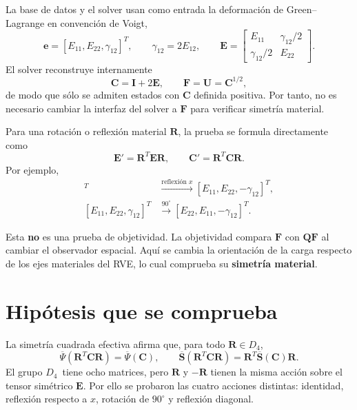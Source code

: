 \documentclass[11pt,a4paper]{article}
\newcommand{\Dfour}{\ensuremath{D_4}}
\newcommand{\Sbar}{\ensuremath{\overline{\mathbf S}}}
\newcommand{\Psibar}{\ensuremath{\overline{\Psi}}}
\begin{document}
La base de datos y el solver usan como entrada la deformación de
Green--Lagrange en convención de Voigt,
\begin{equation}
 \mathbf e = [E_{11},E_{22},\gamma_{12}]^T,
 \qquad \gamma_{12}=2E_{12},
 \qquad
 \mathbf E=
 \begin{bmatrix}
 E_{11} & \gamma_{12}/2\\
 \gamma_{12}/2 & E_{22}
 \end{bmatrix}.
\end{equation}
El solver reconstruye internamente
\begin{equation}
 \mathbf C = \mathbf I+2\mathbf E,
 \qquad
 \mathbf F=\mathbf U=\mathbf C^{1/2},
\end{equation}
de modo que sólo se admiten estados con $\mathbf C$ definida positiva. Por
tanto, no es necesario cambiar la interfaz del solver a $\mathbf F$ para
verificar simetría material.

Para una rotación o reflexión material $\mathbf R$, la prueba se formula
directamente como
\begin{equation}
 \mathbf E' = \mathbf R^T\mathbf E\mathbf R,
 \qquad
 \mathbf C'=\mathbf R^T\mathbf C\mathbf R.
 \label{eq:input-transform}
\end{equation}
Por ejemplo,
\begin{align}
 [E_{11},E_{22},\gamma_{12}]^T
 &\xrightarrow{\text{reflexión }x}
 [E_{11},E_{22},-\gamma_{12}]^T,\\
 [E_{11},E_{22},\gamma_{12}]^T
 &\xrightarrow{90^\circ}
 [E_{22},E_{11},-\gamma_{12}]^T.
\end{align}

Esta \textbf{no} es una prueba de objetividad. La objetividad compara
$\mathbf F$ con $\mathbf Q\mathbf F$ al cambiar el observador espacial. Aquí
se cambia la orientación de la carga respecto de los ejes materiales del RVE,
lo cual comprueba su \textbf{simetría material}.

\section{Hipótesis que se comprueba}

La simetría cuadrada efectiva afirma que, para todo $\mathbf R\in\Dfour$,
\begin{equation}
 \Psibar(\mathbf R^T\mathbf C\mathbf R)=\Psibar(\mathbf C),
 \qquad
 \Sbar(\mathbf R^T\mathbf C\mathbf R)
 =\mathbf R^T\Sbar(\mathbf C)\mathbf R.
 \label{eq:d4}
\end{equation}
El grupo \Dfour\ tiene ocho matrices, pero $\mathbf R$ y $-\mathbf R$ tienen
la misma acción sobre el tensor simétrico $\mathbf E$. Por ello se probaron las
cuatro acciones distintas: identidad, reflexión respecto a $x$, rotación de
$90^\circ$ y reflexión diagonal.
\end{document}
